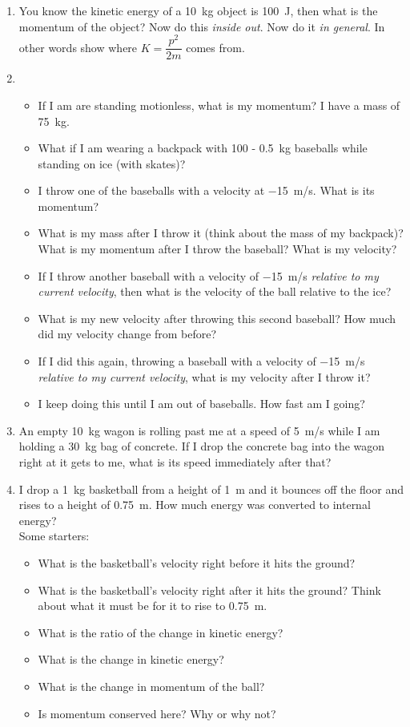 \begin{enumerate}
\item You know the kinetic energy of a \SI{10}{kg} object is \SI{100}{\joule}, then what is the momentum of the object? Now do this \emph{inside out}. Now do it \emph{in general}. In other words show where $K=\dfrac{p^2}{2m}$ comes from.

\item
\begin{itemize}
	\item If I am are standing motionless, what is my momentum? I have a mass of \SI{75}{kg}.
	\item What if I am wearing a backpack with 100 - \SI{0.5}{kg} baseballs while standing on ice (with skates)?
	\item I throw one of the baseballs with a velocity at \SI{-15}{m/s}. What is its momentum?\bigskip
	\item What is my mass after I throw it (think about the mass of my backpack)? What is my momentum after I throw the baseball? What is my velocity?\bigskip
	\item If I throw another baseball with a velocity of \SI{-15}{m/s} \emph{relative to my current velocity}, then what is the velocity of the ball relative to the ice?\bigskip
	\item What is my new velocity after throwing this second baseball? How much did my velocity change from before?\bigskip
	\item If I did this again, throwing a baseball with a velocity of \SI{-15}{m/s} \emph{relative to my current velocity}, what is my velocity after I throw it?\bigskip
	\item I keep doing this until I am out of baseballs. How fast am I going?
\end{itemize}

\item An empty \SI{10}{kg} wagon is rolling past me at a speed of \SI{5}{m/s} while I am holding a \SI{30}{kg} bag of concrete. If I drop the concrete bag into the wagon right at it gets to me, what is its speed immediately after that?\bigskip

\item 
I drop a \SI{1}{kg} basketball from a height of \SI{1}{\meter} and it bounces off the floor and rises to a height of \SI{0.75}{\meter}. How much energy was converted to internal energy?\\
Some starters:
\begin{itemize}
	\item What is the basketball's velocity right before it hits the ground?
	\item What is the basketball's velocity right after it hits the ground? Think about what it must be for it to rise to \SI{0.75}{\meter}.
	\item What is the ratio of the change in kinetic energy?
	\item What is the change in kinetic energy?
	\item What is the change in momentum of the ball?
	\item Is momentum conserved here? Why or why not?
	\giantskip
\end{itemize}


\end{enumerate}
